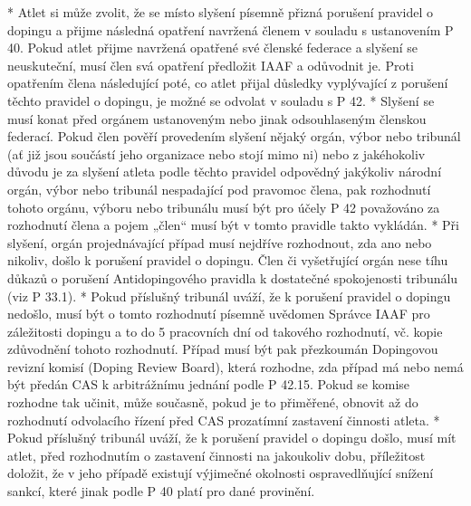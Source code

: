 * Atlet si může zvolit, že se místo slyšení písemně přizná porušení pravidel o dopingu a přijme následná opatření navržená členem v souladu s ustanovením P 40. Pokud atlet přijme navržená opatřené své členské federace a slyšení se neuskuteční, musí člen svá opatření předložit IAAF a odůvodnit je. Proti opatřením člena následující poté, co atlet přijal důsledky vyplývající z porušení těchto pravidel o dopingu, je možné se odvolat v souladu s P 42.
* Slyšení se musí konat před orgánem ustanoveným nebo jinak odsouhlaseným členskou federací. Pokud člen pověří provedením slyšení nějaký orgán, výbor nebo tribunál (ať již jsou součástí jeho organizace nebo stojí mimo ni) nebo z jakéhokoliv důvodu je za slyšení atleta podle těchto pravidel odpovědný jakýkoliv národní orgán, výbor nebo tribunál nespadající pod pravomoc člena, pak rozhodnutí tohoto orgánu, výboru nebo tribunálu musí být pro účely P 42 považováno za rozhodnutí člena a pojem „člen“ musí být v tomto pravidle takto vykládán.
* Při slyšení, orgán projednávající případ musí nejdříve rozhodnout, zda ano nebo nikoliv, došlo k porušení pravidel o dopingu. Člen či vyšetřující orgán nese tíhu důkazů o porušení Antidopingového pravidla k dostatečné spokojenosti tribunálu (viz P 33.1).
* Pokud příslušný tribunál uváží, že k porušení pravidel o dopingu nedošlo, musí být o tomto rozhodnutí písemně uvědomen Správce IAAF pro záležitosti dopingu a to do 5 pracovních dní od takového rozhodnutí, vč. kopie zdůvodnění tohoto rozhodnutí. Případ musí být pak přezkoumán Dopingovou revizní komisí (Doping Review Board), která rozhodne, zda případ má nebo nemá být předán CAS k arbitrážnímu jednání podle P 42.15. Pokud se komise rozhodne tak učinit, může současně, pokud je to přiměřené, obnovit až do rozhodnutí odvolacího řízení před CAS prozatímní zastavení činnosti atleta.
* Pokud příslušný tribunál uváží, že k porušení pravidel o dopingu došlo, musí mít atlet, před rozhodnutím o zastavení činnosti na jakoukoliv dobu, příležitost doložit, že v jeho případě existují výjimečné okolnosti ospravedlňující snížení sankcí, které jinak podle P 40 platí pro dané provinění.

